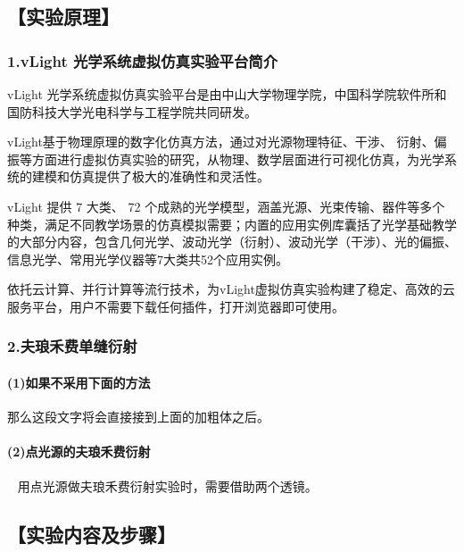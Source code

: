 \documentclass[12pt,a4paper,UTF8]{ctexart}
\begin{document}
\subsection*{【实验原理】}

	\subsubsection*{1.vLight 光学系统虚拟仿真实验平台简介}
	vLight 光学系统虚拟仿真实验平台是由中山大学物理学院，中国科学院软件所和国防科技大学光电科学与工程学院共同研发。\par
	vLight基于物理原理的数字化仿真方法，通过对光源物理特征、干涉、 衍射、偏振等方面进行虚拟仿真实验的研究，从物理、数学层面进行可视化仿真，为光学系统的建模和仿真提供了极大的准确性和灵活性。 

	vLight 提供 7 大类、 72 个成熟的光学模型，涵盖光源、光束传输、器件等多个种类，满足不同教学场景的仿真模拟需要；内置的应用实例库囊括了光学基础教学的大部分内容，包含几何光学、波动光学（衍射）、波动光学（干涉）、光的偏振、信息光学、常用光学仪器等7大类共52个应用实例。

	依托云计算、并行计算等流行技术，为vLight虚拟仿真实验构建了稳定、高效的云服务平台，用户不需要下载任何插件，打开浏览器即可使用。


	\subsubsection*{2.夫琅禾费单缝衍射}
	\paragraph{(1)如果不采用下面的方法}
	那么这段文字将会直接接到上面的加粗体之后。
	\paragraph{(2)点光源的夫琅禾费衍射}~
	\newline %
	\indent 用点光源做夫琅禾费衍射实验时，需要借助两个透镜。


\subsection*{【实验内容及步骤】}
\end{document}

